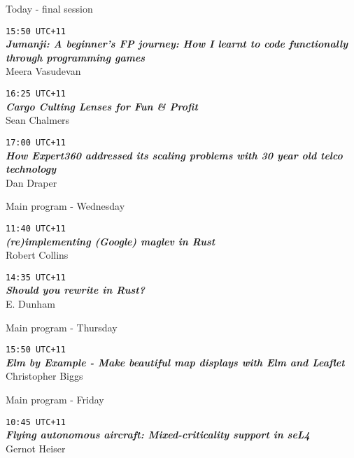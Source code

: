 \documentclass[ignorenonframetext,aspectratio=169]{beamer}
\begin{document}
\begin{frame}{Today - final session}

{\Large \tt 15:50 UTC+11}\\
{\bf \em Jumanji: A beginner's FP journey:
    How I learnt to code functionally through programming games}\\
Meera Vasudevan

\smallskip

{\Large \tt 16:25 UTC+11}\\
{\bf \em Cargo Culting Lenses for Fun \& Profit}\\
Sean Chalmers

\smallskip

{\Large \tt 17:00 UTC+11}\\
{\bf \em How Expert360 addressed its scaling problems
    with 30 year old telco technology}\\
Dan Draper

\end{frame}


\begin{frame}{Main program - Wednesday}

{\Large \tt 11:40 UTC+11}\\
{\bf \em (re)implementing (Google) maglev in Rust}\\
Robert Collins

\bigskip

{\Large \tt 14:35 UTC+11}\\
{\bf \em Should you rewrite in Rust?}\\
E. Dunham

\end{frame}


\begin{frame}{Main program - Thursday}

{\Large \tt 15:50 UTC+11}\\
{\bf \em Elm by Example - Make beautiful map displays with Elm and
    Leaflet}\\
Christopher Biggs

\end{frame}


\begin{frame}{Main program - Friday}

{\Large \tt 10:45 UTC+11}\\
{\bf \em Flying autonomous aircraft: Mixed-criticality support in seL4}\\
Gernot Heiser

\end{frame}
\end{document}
